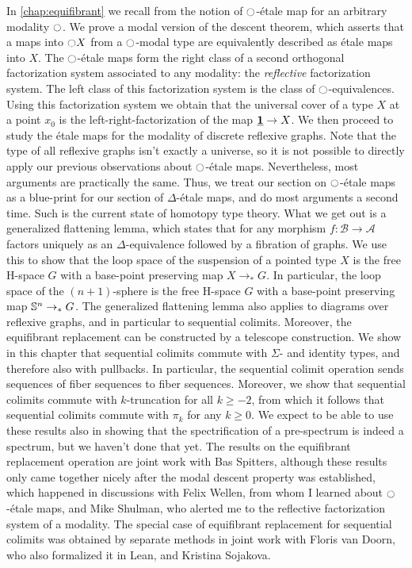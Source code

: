 In \cref{chap:equifibrant} we recall from \cite{WellenPhD} the notion of ${\ocircle}$-\'etale map for an arbitrary modality ${\ocircle}$. We prove a modal version of the descent theorem, which asserts that a maps into ${\ocircle} X$ from a ${\ocircle}$-modal type are equivalently described as \'etale maps into $X$. The ${\ocircle}$-\'etale maps form the right class of a second orthogonal factorization system associated to any modality: the \emph{reflective} factorization system. The left class of this factorization system is the class of ${\ocircle}$-equivalences. Using this factorization system we obtain that the universal cover of a type $X$ at a point $x_0$ is the left-right-factorization of the map $\underline{\mathbf{1}}\to X$. 
We then proceed to study the \'etale maps for the modality of discrete reflexive graphs. Note that the type of all reflexive graphs isn't exactly a universe, so it is not possible to directly apply our previous observations about ${\ocircle}$-\'etale maps. Nevertheless, most arguments are practically the same. Thus, we treat our section on ${\ocircle}$-\'etale maps as a blue-print for our section of $\Delta$-\'etale maps, and do most arguments a second time. Such is the current state of homotopy type theory. What we get out is a generalized flattening lemma, which states that for any morphism $f:\mathcal{B}\to\mathcal{A}$ factors uniquely as an $\Delta$-equivalence followed by a fibration of graphs. We use this to show that the loop space of the suspension of a pointed type $X$ is the free H-space $G$ with a base-point preserving map $X\to_\ast G$. In particular, the loop space of the $(n+1)$-sphere is the free H-space $G$ with a base-point preserving map $\mathbb{S}^{n}\to_\ast G$. 
The generalized flattening lemma also applies to diagrams over reflexive graphs, and in particular to sequential colimits. Moreover, the equifibrant replacement can be constructed by a telescope construction. We show in this chapter that sequential colimits commute with $\Sigma$- and identity types, and therefore also with pullbacks. In particular, the sequential colimit operation sends sequences of fiber sequences to fiber sequences. Moreover, we show that sequential colimits commute with $k$-truncation for all $k\geq -2$, from which it follows that sequential colimits commute with $\pi_k$ for any $k\geq 0$. We expect to be able to use these results also in showing that the spectrification of a pre-spectrum is indeed a spectrum, but we haven't done that yet.
The results on the equifibrant replacement operation are joint work with Bas Spitters, although these results only came together nicely after the modal descent property was established, which happened in discussions with Felix Wellen, from whom I learned about ${\ocircle}$-\'etale maps, and Mike Shulman, who alerted me to the reflective factorization system of a modality. The special case of equifibrant replacement for sequential colimits was obtained by separate methods in joint work with Floris van Doorn, who also formalized it in Lean, and Kristina Sojakova.

